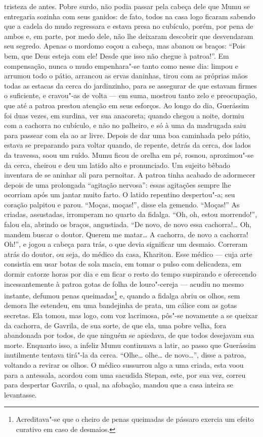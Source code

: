 tristeza de antes. Pobre surdo, não podia passar pela cabeça dele que
Mumu se entregaria sozinha com seus ganidos: de fato, todos na casa logo
ficaram sabendo que a cadela do mudo regressara e estava presa no
cubículo, porém, por pena de ambos e, em parte, por medo dele, não lhe
deixaram descobrir que desvendaram seu segredo. Apenas o mordomo coçou a
cabeça, mas abanou os braços: ``Pois bem, que Deus esteja com ele! Desde
que isso não chegue à patroa!''. Em compensação, nunca o mudo
empenhara"-se tanto como nesse dia: limpou e arrumou todo o pátio,
arrancou as ervas daninhas, tirou com as próprias mãos todas as estacas
da cerca do jardinzinho, para se assegurar de que estavam firmes o
suficiente, e cravou"-as de volta --- em suma, mostrou tanto zelo e
preocupação, que até a patroa prestou atenção em seus esforços. Ao longo
do dia, Guerássim foi duas vezes, em surdina, ver sua anacoreta; quando
chegou a noite, dormiu com a cachorra no cubículo, e não no palheiro, e
só à uma da madrugada saiu para passear com ela ao ar livre. Depois de
dar uma boa caminhada pelo pátio, estava se preparando para
voltar quando, de repente, detrás da cerca, dos lados da travessa, soou
um ruído. Mumu ficou de orelha em pé, rosnou, aproximou"-se da cerca,
cheirou e deu um latido alto e pronunciado. Um sujeito bêbado inventara
de se aninhar ali para pernoitar. A patroa tinha acabado de adormecer
depois de uma prolongada ``agitação nervosa'': essas agitações sempre
lhe ocorriam após um jantar muito farto. O latido repentino despertou"-a;
seu coração palpitou e parou. ``Moças, moças!'', disse ela gemendo.
``Moças!'' As criadas, assustadas, irromperam no quarto da fidalga.
``Oh, oh, estou morrendo!'', falou ela, abrindo os braços, angustiada.
``De novo, de novo essa cachorra!\ldots{} Oh, mandem buscar o doutor. Querem
me matar\ldots{} A cachorra, de novo a cachorra! Oh!'', e jogou a cabeça para
trás, o que devia significar um desmaio. Correram atrás do doutor, ou
seja, do médico da casa, Khariton. Esse médico --- cuja arte consistia
em usar botas de sola macia, em tomar o pulso com delicadeza, em dormir
catorze horas por dia e em ficar o resto do tempo suspirando e
oferecendo incessantemente à patroa gotas de folha de louro"-cereja ---
acudiu no mesmo instante, defumou penas queimadas\footnote{Acreditava"-se
  que o cheiro de penas queimadas de pássaro exercia um efeito curativo
  em caso de desmaios.} e, quando a fidalga abriu os olhos, sem demora
lhe estendeu, em uma bandejinha de prata, um cálice com as gotas
secretas. Ela tomou, mas logo, com voz lacrimosa, pôs"-se
novamente a se queixar da cachorra, de Gavrila, de sua sorte, de que
ela, uma pobre velha, fora abandonada por todos, de que ninguém se
apiedava, de que todos desejavam sua morte. Enquanto isso, a infeliz
Mumu continuava a latir, ao passo que Guerássim inutilmente tentava tirá"-la
da cerca. ``Olhe\ldots{} olhe\ldots{} de novo\ldots{}'', disse a patroa, voltando a
revirar os olhos. O médico sussurrou algo a uma criada, esta voou para a
antessala, acordou com uma sacudida Stepan, este, por sua vez, correu
para despertar Gavrila, o qual, na afobação, mandou que a casa inteira se
levantasse.

